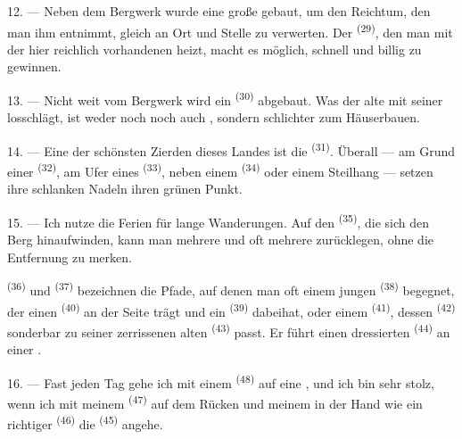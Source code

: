 12. --- Neben dem Bergwerk wurde eine große  gebaut, um den Reichtum,
den man ihm entnimmt, gleich an Ort und Stelle zu verwerten. Der
 \textsuperscript{(29)}, den man mit der hier reichlich
vorhandenen  heizt, macht es möglich, schnell und billig
 zu gewinnen.

13. --- Nicht weit vom Bergwerk wird ein  \textsuperscript{(30)}
abgebaut. Was der alte  mit seiner 
losschlägt, ist weder  noch  noch auch
, sondern schlichter  zum Häuserbauen.

14. --- Eine der schönsten Zierden dieses Landes ist die 
\textsuperscript{(31)}. Überall --- am Grund einer 
\textsuperscript{(32)}, am Ufer eines  \textsuperscript{(33)}, neben
einem  \textsuperscript{(34)} oder einem Steilhang --- setzen ihre
schlanken Nadeln ihren grünen Punkt.

\VUsaut{3.0mm}
\VUsaut{3.0mm}

15. --- Ich nutze die Ferien für lange Wanderungen. Auf den 
\textsuperscript{(35)}, die sich den Berg hinaufwinden, kann man mehrere
 und oft mehrere  zurücklegen, ohne die
Entfernung zu merken.

 \textsuperscript{(36)} und 
\textsuperscript{(37)} bezeichnen die Pfade, auf denen man oft einem jungen
 \textsuperscript{(38)} begegnet, der einen 
\textsuperscript{(40)} an der Seite trägt und ein 
\textsuperscript{(39)} dabeihat, oder einem  \textsuperscript{(41)},
dessen  \textsuperscript{(42)} sonderbar zu seiner zerrissenen
alten  \textsuperscript{(43)} passt. Er führt einen dressierten
 \textsuperscript{(44)} an einer .

\VUsaut{3.0mm}

16. --- Fast jeden Tag gehe ich mit einem  \textsuperscript{(48)}
auf eine , und ich bin sehr stolz, wenn ich mit meinem
 \textsuperscript{(47)} auf dem Rücken und meinem
 in der Hand wie ein richtiger 
\textsuperscript{(46)} die  \textsuperscript{(45)} angehe.


